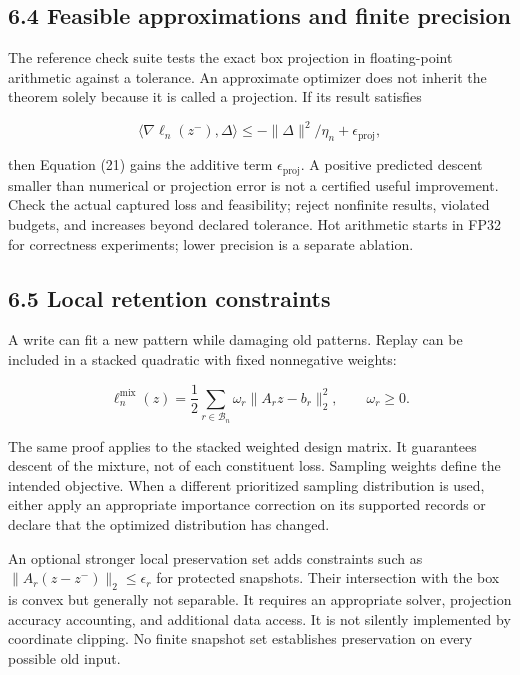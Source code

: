 \documentclass[
  11pt,
  a4paper,
]{article}
\begin{document}
\subsection{6.4 Feasible approximations and finite
precision}\label{feasible-approximations-and-finite-precision}

The reference check suite tests the exact box projection in
floating-point arithmetic against a tolerance. An approximate optimizer
does not inherit the theorem solely because it is called a projection.
If its result satisfies

\[
\langle\nabla\ell_n(z^-),\Delta\rangle
\le-\|\Delta\|^2/\eta_n+\epsilon_{\mathrm{proj}},
\tag{22}
\]

then Equation (21) gains the additive term \(\epsilon_{\mathrm{proj}}\).
A positive predicted descent smaller than numerical or projection error
is not a certified useful improvement. Check the actual captured loss
and feasibility; reject nonfinite results, violated budgets, and
increases beyond declared tolerance. Hot arithmetic starts in FP32 for
correctness experiments; lower precision is a separate ablation.

\subsection{6.5 Local retention
constraints}\label{local-retention-constraints}

A write can fit a new pattern while damaging old patterns. Replay can be
included in a stacked quadratic with fixed nonnegative weights:

\[
\ell_n^{\mathrm{mix}}(z)
=\frac12\sum_{r\in\mathcal B_n}\omega_r
\|A_rz-b_r\|_2^2,
\qquad \omega_r\ge0.
\tag{23}
\]

The same proof applies to the stacked weighted design matrix. It
guarantees descent of the mixture, not of each constituent loss.
Sampling weights define the intended objective. When a different
prioritized sampling distribution is used, either apply an appropriate
importance correction on its supported records or declare that the
optimized distribution has changed.

An optional stronger local preservation set adds constraints such as
\(\|A_r(z-z^-)\|_2\le\epsilon_r\) for protected snapshots. Their
intersection with the box is convex but generally not separable. It
requires an appropriate solver, projection accuracy accounting, and
additional data access. It is not silently implemented by coordinate
clipping. No finite snapshot set establishes preservation on every
possible old input.
\end{document}

